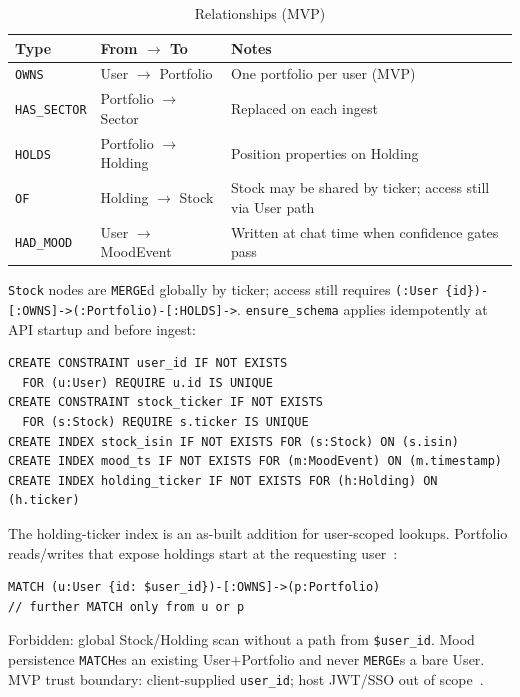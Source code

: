 \begin{table}[!htbp]
\centering
\small
\caption{Relationships (MVP)}
\label{tab:rels}
\begin{tabularx}{\textwidth}{@{}
  >{\raggedright\arraybackslash}p{}
  >{\raggedright\arraybackslash}p{}
  >{\raggedright\arraybackslash}X
  @{}}
\toprule
\textbf{Type} & \textbf{From $\rightarrow$ To} & \textbf{Notes} \\
\midrule
\texttt{OWNS} & User $\rightarrow$ Portfolio & One portfolio per user (MVP) \\
\addlinespace
\texttt{HAS\_SECTOR} & Portfolio $\rightarrow$ Sector & Replaced on each ingest \\
\addlinespace
\texttt{HOLDS} & Portfolio $\rightarrow$ Holding & Position properties on Holding \\
\addlinespace
\texttt{OF} & Holding $\rightarrow$ Stock & Stock may be shared by ticker; access still via User path \\
\addlinespace
\texttt{HAD\_MOOD} & User $\rightarrow$ MoodEvent & Written at chat time when confidence gates pass \\
\bottomrule
\end{tabularx}
\end{table}

\noindent
\texttt{Stock} nodes are \texttt{MERGE}d globally by ticker; access still requires \texttt{(:User \{id\})-[:OWNS]->(:Portfolio)-[:HOLDS]->}. \texttt{ensure\_schema} applies idempotently at API startup and before ingest:

\begin{verbatim}
CREATE CONSTRAINT user_id IF NOT EXISTS
  FOR (u:User) REQUIRE u.id IS UNIQUE
CREATE CONSTRAINT stock_ticker IF NOT EXISTS
  FOR (s:Stock) REQUIRE s.ticker IS UNIQUE
CREATE INDEX stock_isin IF NOT EXISTS FOR (s:Stock) ON (s.isin)
CREATE INDEX mood_ts IF NOT EXISTS FOR (m:MoodEvent) ON (m.timestamp)
CREATE INDEX holding_ticker IF NOT EXISTS FOR (h:Holding) ON (h.ticker)
\end{verbatim}

\noindent
The holding-ticker index is an as-built addition for user-scoped lookups. Portfolio reads/writes that expose holdings start at the requesting user~\cite{trd}:

\begin{verbatim}
MATCH (u:User {id: $user_id})-[:OWNS]->(p:Portfolio)
// further MATCH only from u or p
\end{verbatim}

\noindent
Forbidden: global Stock/Holding scan without a path from \texttt{\$user\_id}. Mood persistence \texttt{MATCH}es an existing User$+$Portfolio and never \texttt{MERGE}s a bare User. MVP trust boundary: client-supplied \texttt{user\_id}; host JWT/SSO out of scope~\cite{prd}.

